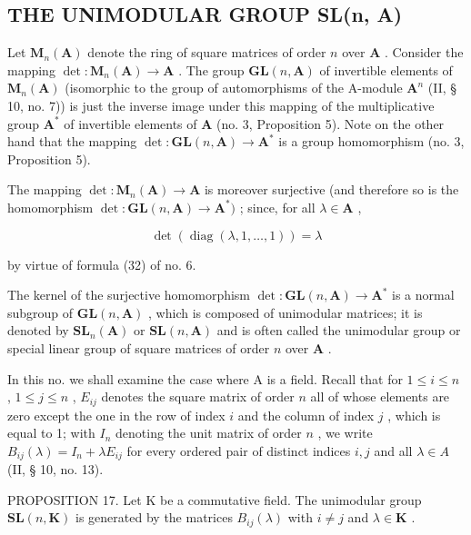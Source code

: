 \subsection{THE UNIMODULAR GROUP SL(n, A)}

Let \(\mathbf{M}_n(\mathbf{A})\) denote the ring of square matrices of order \(n\) over \(\mathbf{A}\) . Consider the mapping \(\det: \mathbf{M}_n(\mathbf{A}) \to \mathbf{A}\) . The group \(\mathbf{GL}(n, \mathbf{A})\) of invertible elements of \(\mathbf{M}_n(\mathbf{A})\) (isomorphic to the group of automorphisms of the A-module \(\mathbf{A}^n\) (II, § 10, no. 7)) is just the inverse image under this mapping of the multiplicative group \(\mathbf{A}^*\) of invertible elements of \(\mathbf{A}\) (no. 3, Proposition 5). Note on the other hand that the mapping \(\det: \mathbf{GL}(n, \mathbf{A}) \to \mathbf{A}^*\) is a group homomorphism (no. 3, Proposition 5).

The mapping \(\operatorname{det}:\mathbf{M}_n(\mathbf{A})\to \mathbf{A}\) is moreover surjective (and therefore so is the homomorphism \(\operatorname{det}:\mathbf{GL}(n,\mathbf{A})\to \mathbf{A}^*)\) ; since, for all \(\lambda \in \mathbf{A}\) ,

\[
\det (\operatorname{diag} (\lambda , 1, \dots , 1)) = \lambda
\]

by virtue of formula (32) of no. 6.

The kernel of the surjective homomorphism \(\operatorname{det}:\mathbf{GL}(n,\mathbf{A})\to \mathbf{A}^*\) is a normal subgroup of \(\mathbf{GL}(n,\mathbf{A})\) , which is composed of unimodular matrices; it is denoted by \(\mathbf{SL}_n(\mathbf{A})\) or \(\mathbf{SL}(n,\mathbf{A})\) and is often called the unimodular group or special linear group of square matrices of order \(n\) over \(\mathbf{A}\) .

In this no. we shall examine the case where A is a field. Recall that for \(1 \leqslant i \leqslant n\) , \(1 \leqslant j \leqslant n\) , \(E_{ij}\) denotes the square matrix of order \(n\) all of whose elements are zero except the one in the row of index \(i\) and the column of index \(j\) , which is equal to 1; with \(I_n\) denoting the unit matrix of order \(n\) , we write \(B_{ij}(\lambda) = I_n + \lambda E_{ij}\) for every ordered pair of distinct indices \(i, j\) and all \(\lambda \in A\) (II, § 10, no. 13).

PROPOSITION 17. Let K be a commutative field. The unimodular group \(\mathbf{SL}(n, \mathbf{K})\) is generated by the matrices \(B_{ij}(\lambda)\) with \(i \neq j\) and \(\lambda \in \mathbf{K}\) .

